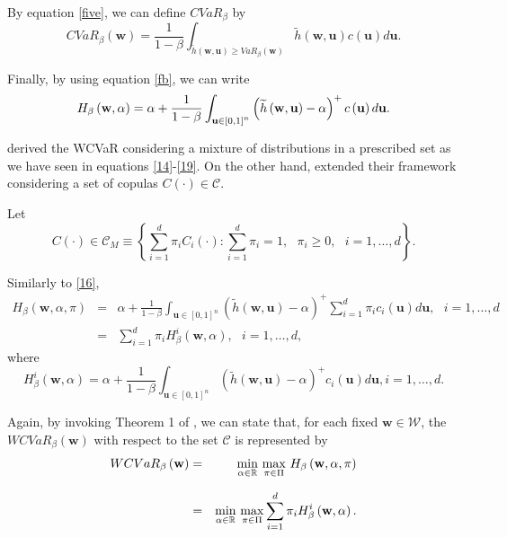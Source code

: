\documentclass[a4paper,10pt]{article}
\begin{document}
By equation \eqref{five}, we can define $CVaR_{\beta }$ by
\begin{equation}
CVaR_{\beta }\left( \mathbf{w}\right) =\frac{1}{1-\beta }\int_{\widetilde{h}\left(
	\mathbf{w,u}\right) \geq VaR_{\beta }\left( \mathbf{w}\right) }\widetilde{h}\left(
\mathbf{w,u}\right) c\left( \mathbf{u}\right) d\mathbf{u}.  \label{26}
\end{equation}

Finally, by using equation \eqref{fb}, we can write
\begin{equation}
H_{\beta }\left( \mathbf{w},\alpha \right) =\alpha +\frac{1}{1-\beta }\int_{%
	\mathbf{u} \in \left[ 0,1\right] ^{n}}\left( \widetilde{h}\left( \mathbf{w,u}\right)
-\alpha \right) ^{+}c\left( \mathbf{u}\right) d\mathbf{u.}  \label{27}
\end{equation}

\citet*{zhu2009worst} derived the WCVaR considering a mixture of distributions in a prescribed set as we have seen in equations \eqref{14}-\eqref{19}. On the other hand, \citet*{kakouris14} extended their framework considering a set of copulas $C\left( \cdot \right) \in \mathcal{C}$.

Let
\begin{equation}
C\left( \cdot \right) \in \mathcal{C}_{M}\equiv \left\{ \sum_{i=1}^{d}\pi
_{i}C_{i}\left( \cdot \right) :\sum_{i=1}^{d}\pi _{i}=1,\text{ }\pi _{i}\geq
0,\text{ }i=1,\ldots,d\right\}.  \label{28}
\end{equation}

Similarly to \eqref{16}, 
\begin{eqnarray}
H_{\beta }\left( \mathbf{w},\alpha ,\pi \right) &=&\alpha +\frac{1}{1-\beta }%
\int_{\mathbf{u}\in \left[ 0,1\right] ^{n}}\left( \widetilde{h}\left( \mathbf{w,u}%
\right) -\alpha \right) ^{+}\sum_{i=1}^{d}\pi _{i}c_{i}\left( \mathbf{u}%
\right) d\mathbf{u},\text{ }i=1,\ldots,d  \label{28b} \\
&=&\sum_{i=1}^{d}\pi _{i}H_{\beta }^{i}\left( \mathbf{w},\alpha \right) ,%
\text{ }i=1,\ldots,d,\label{29}
\end{eqnarray}%
where
\begin{equation}
H_{\beta }^{i}\left( \mathbf{w},\alpha \right) =\alpha +\frac{1}{1-\beta }%
\int_{\mathbf{u}\in \left[ 0,1\right] ^{n}}\left( \widetilde{h}\left( \mathbf{w,u}%
\right) -\alpha \right) ^{+}c_{i}\left( \mathbf{u}\right) d\mathbf{u},\text{
}i=1,\ldots,d.  \label{30}
\end{equation}

Again, by invoking Theorem 1 of \citet*{zhu2009worst}, we can state that, for each fixed $\mathbf{w}\in \mathcal{W}$, the $WCVaR_{\beta }\left( \mathbf{w} \right) $ with respect to the set $\mathcal{C}$ is represented by
\begin{eqnarray}
WCVaR_{\beta }\left( \mathbf{w}\right) &=&\underset{}{\underset{\alpha \in
		\mathbb{R}}{\min }~\underset{\pi \in \Pi }{\max }}~H_{\beta }\left( \mathbf{w},\alpha
,\pi \right)  \notag \\
&=&\underset{}{\underset{\alpha \in	\mathbb{R}	}{\min }~\underset{\pi \in \Pi }{\max }}\sum_{i=1}^{d}\pi _{i}H_{\beta}^{i}\left( \mathbf{w},\alpha \right).  \label{31}
\end{eqnarray}
\end{document}
